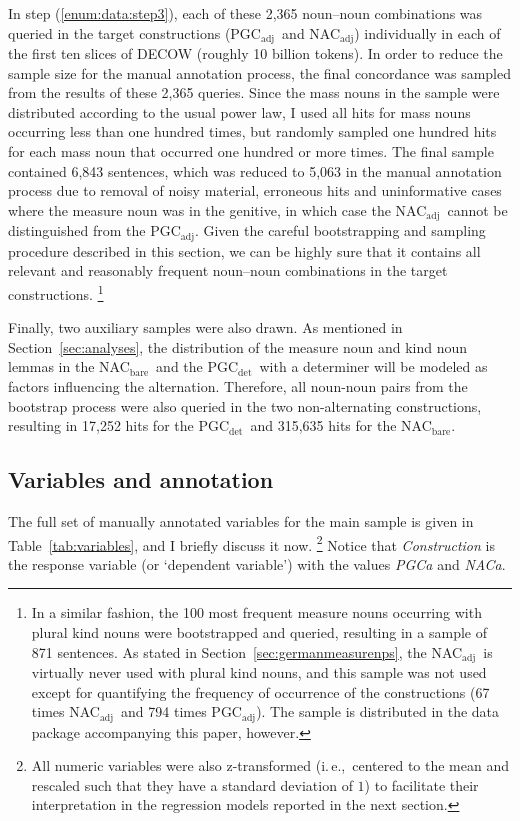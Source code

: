 \documentclass[USenglish]{article}
\newcommand{\ie}{i.\,e.,}
\newcommand{\Sub}[1]{\ensuremath{\mathrm{_{#1}}}}
\newcommand{\NACb}{NAC\Sub{bare}}
\newcommand{\NACa}{NAC\Sub{adj}}
\newcommand{\PGCd}{PGC\Sub{det}}
\newcommand{\PGCa}{PGC\Sub{adj}}
\begin{document}
In step (\ref{enum:data:step3}), each of these 2,365 noun–noun combinations was queried in the target constructions (\PGCa\ and \NACa) individually in each of the first ten slices of DECOW (roughly 10 billion tokens).
In order to reduce the sample size for the manual annotation process, the final concordance was sampled from the results of these 2,365 queries.
Since the mass nouns in the sample were distributed according to the usual power law, I used all hits for mass nouns occurring less than one hundred times, but randomly sampled one hundred hits for each mass noun that occurred one hundred or more times.
The final sample contained 6,843 sentences, which was reduced to 5,063 in the manual annotation process due to removal of noisy material, erroneous hits and uninformative cases where the measure noun was in the genitive, in which case the \NACa\ cannot be distinguished from the \PGCa.
Given the careful bootstrapping and sampling procedure described in this section, we can be highly sure that it contains all relevant and reasonably frequent noun–noun combinations in the target constructions.%
\footnote{In a similar fashion, the 100 most frequent measure nouns occurring with plural kind nouns were bootstrapped and queried, resulting in a sample of 871 sentences.
As stated in Section~\ref{sec:germanmeasurenps}, the \NACa\ is virtually never used with plural kind nouns, and this sample was not used except for quantifying the frequency of occurrence of the constructions (67 times \NACa\ and 794 times \PGCa).
The sample is distributed in the data package accompanying this paper, however.
}

Finally, two auxiliary samples were also drawn.
As mentioned in Section~\ref{sec:analyses}, the distribution of the measure noun and kind noun lemmas in the \NACb\ and the \PGCd\ with a determiner will be modeled as factors influencing the alternation.
Therefore, all noun-noun pairs from the bootstrap process were also queried in the two non-alternating constructions, resulting in 17,252 hits for the \PGCd\ and 315,635 hits for the \NACb.



\subsection{Variables and annotation}
\label{sec:annotation}

The full set of manually annotated variables for the main sample is given in Table~\ref{tab:variables}, and I briefly discuss it now.%
\footnote{All numeric variables were also z-transformed (\ie\ centered to the mean and rescaled such that they have a standard deviation of $1$) to facilitate their interpretation in the regression models reported in the next section.}
Notice that \textit{Construction} is the response variable (or `dependent variable') with the values \textit{PGCa} and \textit{NACa}.
\end{document}
